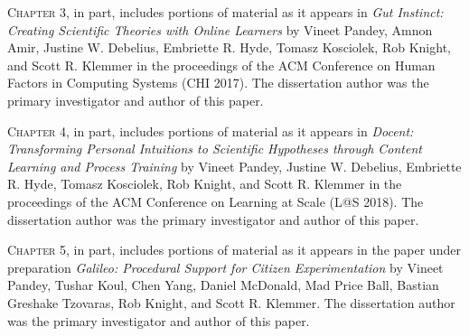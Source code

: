 \begin{frontmatter}
\begin{acknowledgements}
\vspace{0.25in}

\textsc{Chapter 3}, in part, includes portions of material as it appears in \emph{Gut Instinct: Creating Scientific Theories with Online Learners} by Vineet Pandey, Amnon Amir, Justine W. Debelius, Embriette R. Hyde, Tomasz Kosciolek, Rob Knight, and Scott R. Klemmer in the proceedings of the ACM Conference on Human Factors in Computing Systems (CHI 2017). The dissertation author was the primary investigator and author of this paper.

\textsc{Chapter 4}, in part, includes portions of material as it appears in \emph{Docent: Transforming Personal Intuitions to Scientific Hypotheses through Content Learning and Process Training} by Vineet Pandey, Justine W. Debelius, Embriette R. Hyde, Tomasz Kosciolek, Rob Knight, and Scott R. Klemmer in the proceedings of the ACM Conference on Learning at Scale (L@S 2018). The dissertation author was the primary investigator and author of this paper.

\textsc{Chapter 5}, in part, includes portions of material as it appears in the paper under preparation \emph{Galileo: Procedural Support for Citizen Experimentation} by Vineet Pandey, Tushar Koul, Chen Yang, Daniel McDonald, Mad Price Ball, Bastian Greshake Tzovaras, Rob Knight, and Scott R. Klemmer. The dissertation author was the primary investigator and author of this paper.

\end{acknowledgements}


\end{frontmatter}
